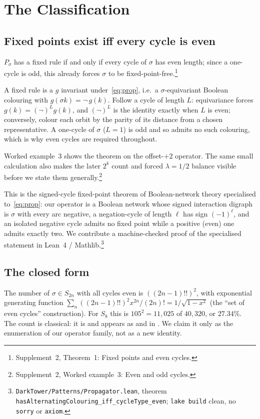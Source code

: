 \documentclass[man,12pt,floatsintext,donotrepeattitle]{apa7}
\newcommand{\sig}{\sigma}
\newcommand{\supptheorytext}[2]{Supplement~2, #1: #2.}
\newcommand{\supptheory}[2]{\footnote{\supptheorytext{#1}{#2}}}
\begin{document}
\section{The Classification}
\label{sec:classification}

\subsection{Fixed points exist iff every cycle is even}

$P_\sig$ has a fixed rule if and only if every cycle of $\sig$ has even length;
since a one-cycle is odd, this already forces $\sig$ to be fixed-point-free.\supptheory{Theorem~1}{Fixed points and even cycles}

\noindent A fixed rule is a $g$ invariant under~\eqref{eq:prop}, i.e.\ a
$\sig$-equivariant Boolean colouring with $g(\sig k) = \lnot\,g(k)$.
Follow a cycle of length $L$: equivariance forces
$g(k) = (\lnot)^{L} g(k)$, and $(\lnot)^{L}$ is the identity exactly when
$L$ is even; conversely, colour each orbit by the parity of its distance
from a chosen representative. A one-cycle of $\sig$ ($L=1$) is odd and so
admits no such colouring, which is why even cycles are required throughout.

Worked example~3 shows the theorem on the offset-$+2$ operator. The
same small calculation also makes the later $2^k$ count and forced
$\lambda=1/2$ balance visible before we state them generally.\supptheory{Worked example~3}{Even and odd cycles}

This is the signed-cycle fixed-point theorem of Boolean-network theory
\parencite{aracena2008maximum} specialised to~\eqref{eq:prop}: our operator
is a Boolean network whose signed interaction digraph is $\sig$ with every
arc negative, a negation-cycle of length $\ell$ has sign $(-1)^\ell$, and
an isolated negative cycle admits no fixed point while a positive (even)
one admits exactly two. We contribute a machine-checked proof of the
specialised statement in Lean~4 / Mathlib.\footnote{%
\texttt{DarkTower/Patterns/Propagator.lean}, theorem
\texttt{hasAlternatingColouring\_iff\_cycleType\_even}; \texttt{lake build}
clean, no \texttt{sorry} or \texttt{axiom}.}

\subsection{The closed form}

The number of $\sig \in S_{2n}$ with all cycles even is $((2n-1)!!)^2$, with
exponential generating function $\sum_n ((2n-1)!!)^2 x^{2n}/(2n)! =
1/\sqrt{1-x^2}$ (the ``set of even cycles'' construction).
For $S_8$ this is $105^2 = 11{,}025$ of $40{,}320$, or $27.34\%$. The count
is classical: it is \textcite{oeis_a001818} and appears as
\textcite[Problem~5.34(c)]{stanley1999enumerative} and in
\textcite{riordan1968combinatorial}. We claim it only as the enumeration of
our operator family, not as a new identity.
\end{document}
